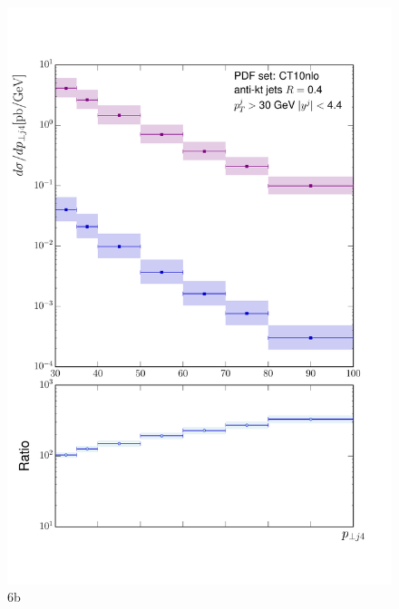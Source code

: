 	\begin{figure}[h]
		\centering
		\includegraphics[width=0.8\linewidth]{Figures/ATLAS_Z_100TeV_6b.pdf}
		\caption{6b}
		\label{fig:emissionsites}
	\end{figure}

